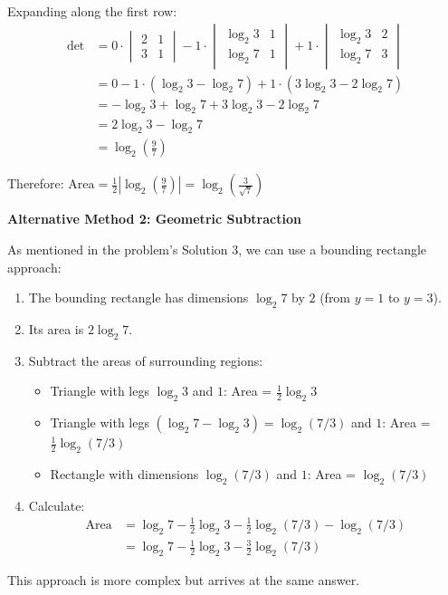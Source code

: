 \documentclass[12pt]{article}
\begin{document}
\begin{solutionbox}
Expanding along the first row:
\begin{align*}
    \det &= 0 \cdot \begin{vmatrix} 2 & 1 \\ 3 & 1 \end{vmatrix} - 1 \cdot \begin{vmatrix} \log_2 3 & 1 \\ \log_2 7 & 1 \end{vmatrix} + 1 \cdot \begin{vmatrix} \log_2 3 & 2 \\ \log_2 7 & 3 \end{vmatrix} \\
    &= 0 - 1 \cdot (\log_2 3 - \log_2 7) + 1 \cdot (3\log_2 3 - 2\log_2 7) \\
    &= -\log_2 3 + \log_2 7 + 3\log_2 3 - 2\log_2 7 \\
    &= 2\log_2 3 - \log_2 7 \\
    &= \log_2\left(\frac{9}{7}\right)
\end{align*}

Therefore: $\text{Area} = \frac{1}{2}\left|\log_2\left(\frac{9}{7}\right)\right| = \log_2\left(\frac{3}{\sqrt{7}}\right)$ \checkmark

\vspace{0.3cm}

\textbf{Alternative Method 2: Geometric Subtraction}

As mentioned in the problem's Solution 3, we can use a bounding rectangle approach:

\begin{enumerate}
    \item The bounding rectangle has dimensions $\log_2 7$ by $2$ (from $y=1$ to $y=3$).
    \item Its area is $2\log_2 7$.
    
    \item Subtract the areas of surrounding regions:
    \begin{itemize}
        \item Triangle with legs $\log_2 3$ and $1$: Area = $\frac{1}{2}\log_2 3$
        \item Triangle with legs $(\log_2 7 - \log_2 3) = \log_2(7/3)$ and $1$: Area = $\frac{1}{2}\log_2(7/3)$
        \item Rectangle with dimensions $\log_2(7/3)$ and $1$: Area = $\log_2(7/3)$
    \end{itemize}
    
    \item Calculate:
    \begin{align*}
        \text{Area} &= \log_2 7 - \frac{1}{2}\log_2 3 - \frac{1}{2}\log_2(7/3) - \log_2(7/3) \\
        &= \log_2 7 - \frac{1}{2}\log_2 3 - \frac{3}{2}\log_2(7/3)
    \end{align*}
\end{enumerate}

This approach is more complex but arrives at the same answer.
\end{solutionbox}
\end{document}
